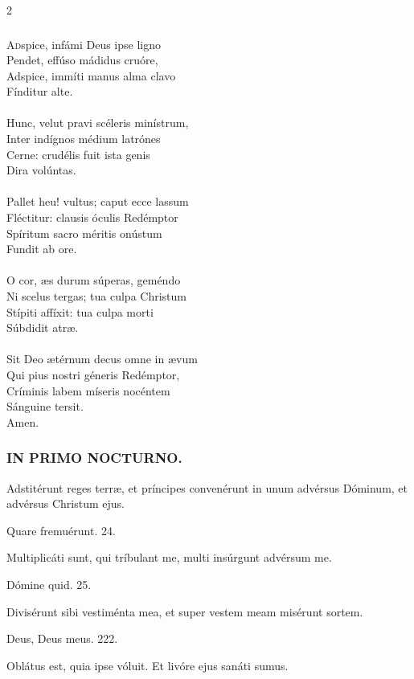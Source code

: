 \documentclass[9pt,twoside]{extarticle}
\begin{document}
\begin{multicols}{2}
\subsubsection*{\center{}}
\lettrine{A}dspice, infámi Deus ipse ligno\\
Pendet, effúso mádidus cruóre,\\
Adspice, immíti manus alma clavo\\
Fínditur alte.\\
\\
Hunc, velut pravi scéleris minístrum,\\
Inter indígnos médium latrónes\\
Cerne: crudélis fuit ista genis\\
Dira volúntas.\\
\\
Pallet heu! vultus; caput ecce lassum\\
Fléctitur: clausis óculis Redémptor\\
Spíritum sacro méritis onústum\\
Fundit ab ore.\\
\\
O cor, æs durum súperas, geméndo\\
Ni scelus tergas; tua culpa Christum\\
Stípiti affíxit: tua culpa morti\\
Súbdidit atræ.\\
\\
Sit Deo ætérnum decus omne in ævum\\
Qui pius nostri géneris Redémptor,\\
Críminis labem míseris nocéntem\\
Sánguine tersit.\\
Amen.

\subsubsection*{\center \textsc{IN PRIMO NOCTURNO.}}
\begin{tightlist}{}
\item {} Adstitérunt reges terræ, et príncipes convenérunt in unum advérsus Dóminum, et advérsus Christum ejus.
\item {} Quare fremuérunt. 24.
\item {} Multiplicáti sunt, qui tríbulant me, multi insúrgunt advérsum me.
\item {} Dómine quid. 25.
\item {} Divisérunt sibi vestiménta mea, et super vestem meam misérunt sortem.
\item {} Deus, Deus meus. 222.
\item {} Oblátus est, quia ipse vóluit.  Et livóre ejus sanáti sumus.
\item {}
\end{tightlist}


\end{multicols}
\end{document}

